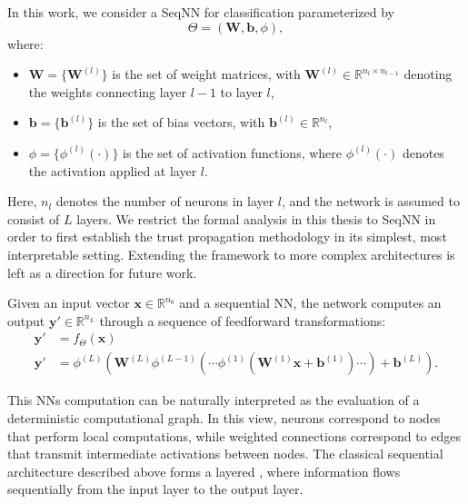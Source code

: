 In this work, we consider a \ac{SeqNN} for classification parameterized by
\[
\Theta = (\mathbf{W}, \mathbf{b}, \phi),
\]
where:
\begin{itemize}
    \item $\mathbf{W} = \{\mathbf{W}^{(l)}\}$ is the set of weight matrices, with $\mathbf{W}^{(l)} \in \mathbb{R}^{n_l \times n_{l-1}}$ denoting the weights connecting layer $l-1$ to layer $l$,
    \item $\mathbf{b} = \{\mathbf{b}^{(l)}\}$ is the set of bias vectors, with $\mathbf{b}^{(l)} \in \mathbb{R}^{n_l}$,
    \item $\phi = \{\phi^{(l)}(\cdot)\}$ is the set of activation functions, where $\phi^{(l)}(\cdot)$ denotes the activation applied at layer $l$.
\end{itemize}
Here, $n_l$ denotes the number of neurons in layer $l$, and the network is assumed to consist of $L$ layers. We restrict the formal analysis in this thesis to \ac{SeqNN} in order to first establish the trust propagation methodology in its simplest, most interpretable setting. Extending the framework to more complex architectures is left as a direction for future work.

Given an input vector $\mathbf{x} \in \mathbb{R}^{n_0}$ and a sequential \ac{NN}, the network computes an output $\mathbf{y}' \in \mathbb{R}^{n_L}$ through a sequence of feedforward transformations:
\begin{align}
\label{eq:nnfeed}
\mathbf{y}' &= f_\Theta(\mathbf{x}) \\
\mathbf{y}' &= \phi^{(L)}\!\left(
\mathbf{W}^{(L)} 
\phi^{(L-1)}\!\left(
\cdots
\phi^{(1)}\!\left(
\mathbf{W}^{(1)} \mathbf{x} + \mathbf{b}^{(1)}
\right)
\cdots
\right)
+ \mathbf{b}^{(L)}
\right). \nonumber
\end{align}

This \acp{NN} computation can be naturally interpreted as the evaluation of a deterministic computational graph. In this view, neurons correspond to nodes that perform local computations, while weighted connections correspond to edges that transmit intermediate activations between nodes. The classical sequential architecture described above forms a layered , where information flows sequentially from the input layer to the output layer. 

